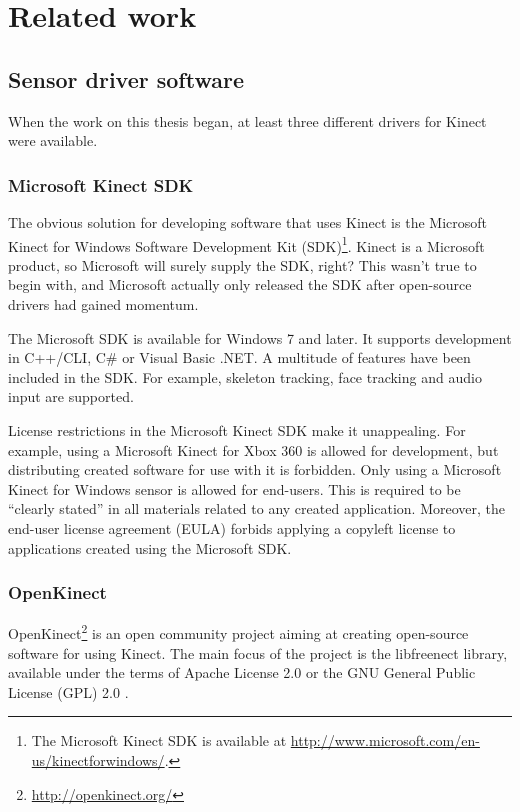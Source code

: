 \chapter{Related work}


\section{Sensor driver software} \label{literature.drivers}

When the work on this thesis began, at least three different drivers for Kinect were available. 

\subsection{Microsoft Kinect SDK}

The obvious solution for developing software that uses Kinect is the Microsoft Kinect for Windows Software Development Kit (SDK)\footnote{The Microsoft Kinect SDK is available at \url{http://www.microsoft.com/en-us/kinectforwindows/}.}. Kinect is a Microsoft product, so Microsoft will surely supply the SDK, right? This wasn't true to begin with, and Microsoft actually only released the SDK after open-source drivers had gained momentum.

The Microsoft SDK is available for Windows 7 and later. It supports development in C++/CLI, C\# or Visual Basic .NET. A multitude of features have been included in the SDK. For example, skeleton tracking, face tracking and audio input are supported.

License restrictions in the Microsoft Kinect SDK make it unappealing. For example, using a Microsoft Kinect for Xbox 360 is allowed for development, but distributing created software for use with it is forbidden. Only using a Microsoft Kinect for Windows sensor is allowed for end-users. This is required to be ``clearly stated'' in all materials related to any created application. Moreover, the end-user license agreement (EULA) forbids applying a copyleft license to applications created using the Microsoft SDK. \citep{kinectEULA}

\subsection{OpenKinect}

OpenKinect\footnote{\url{http://openkinect.org/}} is an open community project aiming at creating open-source software for using Kinect. The main focus of the project is the libfreenect library, available under the terms of Apache License 2.0 \citep{Apache2} or the GNU General Public License (GPL) 2.0 \citep{GPL2}.

